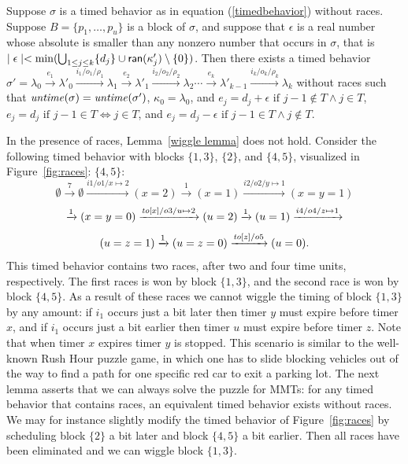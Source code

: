 \begin{lemma}
\label{wiggle lemma}
Suppose $\sigma$ is a timed behavior as in equation (\ref{timedbehavior}) without races.
Suppose $B = \{ p_1 ,\ldots, p_u \}$ is a block of $\sigma$, and suppose
that $\epsilon$ is a real number whose absolute is smaller than any nonzero number that occurs in $\sigma$, that is
$\mid \epsilon \mid  < \min (\bigcup_{1 \leq j \leq k} \{ d_j \} \cup {\textsf{ran}}(\kappa'_j) \setminus \{ 0 \} )$.
Then there exists a timed behavior
$\sigma'  =  \lambda_0 \xrightarrow{e_1} \lambda'_0 \xrightarrow{i_1/o_1/\rho_1} \lambda_1 \xrightarrow{e_2} \lambda'_1 \xrightarrow{i_2/o_2/ \rho_2} \lambda_2 \cdots
\xrightarrow{e_k} \lambda'_{k-1} \xrightarrow{i_k/o_k/\rho_k} \lambda_{k}$
without races such that
$\mathit{untime}(\sigma)=\mathit{untime}(\sigma')$,
$\kappa_0 = \lambda_0$, and
$e_j  =  d_j + \epsilon  \mbox{ if } j-1 \not\in T \wedge j \in T$,
$e_j = d_j  \mbox{ if } j-1 \in T \Leftrightarrow j \in T$, and
$e_j = d_j - \epsilon  \mbox{ if } j-1 \in T \wedge j \not\in T$.
\end{lemma}
In the presence of races, Lemma~\ref{wiggle lemma} does not hold. 
Consider the 
\iflong
following 
\fi
timed behavior with blocks $\{ 1, 3 \}$, $\{ 2 \}$,
and 
\iflong
$\{ 4, 5 \}$, visualized in Figure~\ref{fig:races}:
\else
$\{ 4, 5 \}$:
\fi
\[
\emptyset \xrightarrow{7} \emptyset \xrightarrow{i1/o1/x \mapsto 2} (x=2) \xrightarrow{1} (x=1)
\xrightarrow{i2/o2/y \mapsto 1} (x=y=1)  
\]
\[
\xrightarrow{1} (x=y=0)
\xrightarrow{\mathit{to}[x]/o3/u \mapsto 2} (u=2)
\xrightarrow{1} (u=1)
\xrightarrow{i4/o4/z \mapsto 1} 
\]
\[
(u=z=1)
\xrightarrow{1} (u=z=0)\xrightarrow{\mathit{to}[z]/o5} (u=0).
\]
This timed behavior contains two races, after two and four time units, respectively.
The first races is won by block $\{ 1, 3 \}$, and the second race is won by block $\{ 4, 5 \}$.
As a result of these races we cannot wiggle the timing of block $\{ 1, 3 \}$ by any amount:
if $i_1$ occurs just a bit later then timer $y$ must expire before timer $x$,
and if $i_1$ occurs just a bit earlier then timer $u$ must expire before timer $z$.
Note that when timer $x$ expires timer $y$ is stopped.
This scenario is similar to the well-known Rush Hour puzzle game,
in which one has to slide blocking vehicles out of the way to find a path for one specific red car to exit a parking lot.
The next lemma asserts that we can always solve the puzzle for MMTs: for any timed behavior that contains races,
an equivalent timed behavior exists without races.
We may for instance slightly modify the timed behavior
\iflong
of Figure~\ref{fig:races} 
\fi
by scheduling block $\{ 2  \}$
a bit later and block $\{ 4, 5 \}$ a bit earlier.
Then all races have been eliminated and we can wiggle block $\{ 1, 3 \}$.

